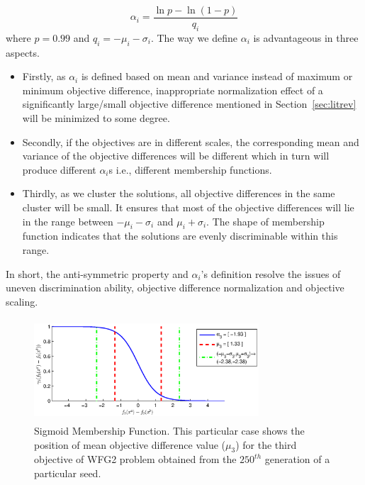 \documentclass[review]{elsarticle}
\begin{document}
\begin{equation} \label{eq:alpha}
	\alpha_i = \frac{\ln{p}-\ln(1-p)}{q_i}
\end{equation}
where $p=0.99$ and $q_i = -\mu_i - \sigma_i$. The way we define $\alpha_i$ is advantageous in three aspects.
\begin{itemize}
\item Firstly, as $\alpha_i$ is defined based on mean and variance  
instead of maximum or minimum objective difference, inappropriate normalization effect of a significantly large/small objective difference
mentioned in Section~\ref{sec:litrev} will be minimized to some degree.

\item Secondly, if the objectives are in different scales, the corresponding mean and variance of the objective differences will be different
which in turn will produce different $\alpha_i$s i.e., different membership functions.

\item Thirdly, as we cluster the solutions,  all objective differences  in the same cluster
will be small. It ensures that most of the objective differences  will lie in the range between
$-\mu_i-\sigma_i$ and $\mu_i+\sigma_i$. The shape of  membership function indicates that the solutions are evenly discriminable within this range. 
\end{itemize}
In short, the anti-symmetric property and $\alpha_i$'s definition resolve the issues of uneven discrimination ability, objective difference normalization and objective scaling.




\begin{figure}[htbp] 
\centering 
	\includegraphics[width=3.3in,height=1.50in]{figures/proposedalgorithm/Nsigmoidfunctionwfg2_3.eps}	
\caption{Sigmoid Membership Function.
This particular case shows the position of mean objective difference value ($\mu_3$) for the third  objective of WFG2 problem obtained from the $250^{th}$ generation of a particular seed.}
\label{fig:sigmoidfunction}
\end{figure}
\end{document}
